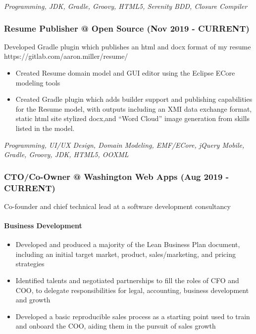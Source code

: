 \emph{Programming, JDK, Gradle, Groovy, HTML5, Serenity BDD, Closure
Compiler}

\hypertarget{resume-publisher-open-source-nov-2019---current}{%
\subsubsection{Resume Publisher @ Open Source (Nov 2019 -
CURRENT)}\label{resume-publisher-open-source-nov-2019---current}}

Developed Gradle plugin which publishes an html and docx format of my
resume https://gitlab.com/aaron.miller/resume/

\begin{itemize}
\tightlist
\item
  Created Resume domain model and GUI editor using the Eclipse ECore
  modeling tools
\item
  Created Gradle plugin which adds builder support and publishing
  capabilities for the Resume model, with outputs including an XMI data
  exchange format, static html site stylized docx,and ``Word Cloud''
  image generation from skills listed in the model.
\end{itemize}

\emph{Programming, UI/UX Design, Domain Modeling, EMF/ECore, jQuery
Mobile, Gradle, Groovy, JDK, HTML5, OOXML}

\hypertarget{ctoco-owner-washington-web-apps-aug-2019---current}{%
\subsubsection{CTO/Co-Owner @ Washington Web Apps (Aug 2019 -
CURRENT)}\label{ctoco-owner-washington-web-apps-aug-2019---current}}

Co-founder and chief technical lead at a software development
consultancy

\hypertarget{business-development}{%
\paragraph{Business Development}\label{business-development}}

\begin{itemize}
\tightlist
\item
  Developed and produced a majority of the Lean Business Plan document,
  including an initial target market, product, sales/marketing, and
  pricing strategies
\item
  Identified talents and negotiated partnerships to fill the roles of
  CFO and COO, to delegate responsibilities for legal, accounting,
  business development and growth
\item
  Developed a basic reproducible sales process as a starting point used
  to train and onboard the COO, aiding them in the pursuit of sales
  growth
\end{itemize}

